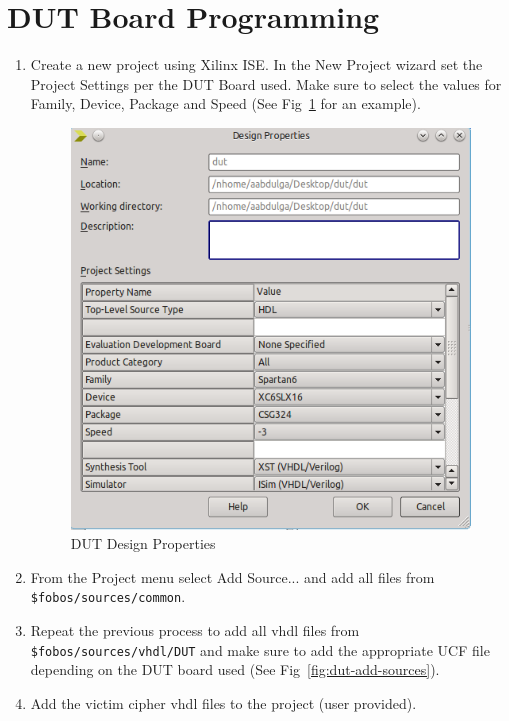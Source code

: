 \section{DUT Board Programming}
\begin{enumerate}
  \item Create a new project using Xilinx ISE. In the New Project wizard set the Project Settings per the DUT Board used. Make sure to select the values for Family, Device, Package and Speed (See Fig~\ref{fig:dut-design-properties} for an example).
		\begin{figure}[H]
		\begin{center}
		\includegraphics[scale=0.6]{figures/dut-design-properties}
		\caption{\label{fig:dut-design-properties}DUT Design Properties}
		\end{center}
		\vspace{-1ex}
		\end{figure}
  \item From the Project menu select Add Source... and add all files from \texttt{\$fobos/sources/common}.
  \item Repeat the previous process to add all vhdl files from \texttt{\$fobos/sources/vhdl/DUT} and make sure to add the appropriate UCF file depending on the DUT board used (See Fig~\ref{fig:dut-add-sources}).
  	\item Add the victim cipher vhdl files to the project (user provided).

\end{enumerate}
